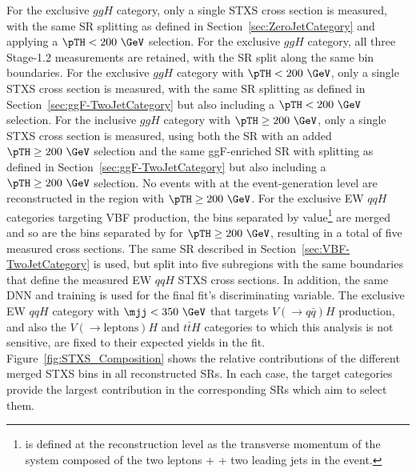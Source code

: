 For the exclusive \ZeroJet $ggH$ category, only a single STXS cross section is measured, with the same SR splitting as defined in Section~\ref{sec:ZeroJetCategory} and applying a $\pTH < 200~\GeV$ selection.
For the exclusive \OneJet $ggH$ category, all three Stage-1.2 measurements are retained, with the SR split along the same \pTH bin boundaries.
For the exclusive \TwoJet $ggH$ category with $\pTH < 200~\GeV$, only a single STXS cross section is measured, with the same SR splitting as defined in Section~\ref{sec:ggF-TwoJetCategory} but also including a $\pTH < 200~\GeV$ selection.
For the \Njets inclusive $ggH$ category with $\pTH \ge200~\GeV$, only a single STXS cross section is measured, using both the \OneJet SR with an added $\pTH \ge200~\GeV$ selection and the same ggF-enriched \TwoJet SR with splitting as defined in Section~\ref{sec:ggF-TwoJetCategory} but also including a $\pTH \ge200~\GeV$ selection. No events with \ZeroJet at the event-generation level are reconstructed in the region with $\pTH \ge200~\GeV$.
For the exclusive \TwoJet EW $qqH$ categories targeting VBF production, the bins separated by \pTHjj value\footnote{\pTHjj is defined at the reconstruction level as the transverse momentum of the system composed of the two leptons + \met + two leading jets in the event.} are merged and so are the bins separated by \mjj for $\pTH \ge200~\GeV$, resulting in a total of five measured cross sections.
The same SR described in Section~\ref{sec:VBF-TwoJetCategory} is used, but split into five subregions with the same boundaries that define the measured EW $qqH$ STXS cross sections. In addition, the same DNN and training is used for the final fit's discriminating variable.
The exclusive \TwoJet EW $qqH$ category with $\mjj < 350~\GeV$ that targets $V(\rightarrow q\bar{q})H$ production, and also the $V(\to \textrm{leptons})H$ and $t\bar{t}H$ categories to which this analysis is not sensitive, are fixed to their expected yields in the fit.
Figure~\ref{fig:STXS_Composition} shows the relative contributions of the different merged STXS bins in all reconstructed SRs.
In each case, the target categories provide the largest contribution in the corresponding SRs which aim to select them.

